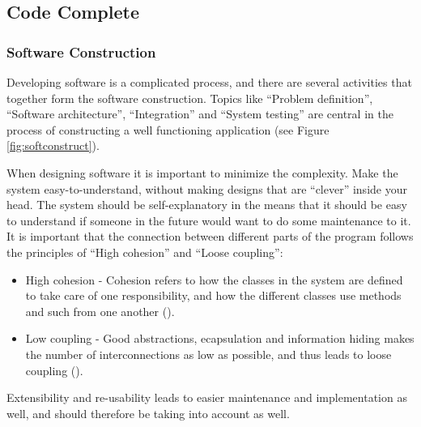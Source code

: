 \subsection{Code Complete}
\subsubsection{Software Construction}
\label{sec:softconstruct}
Developing software is a complicated process, and there are several activities that together form the software construction. Topics like ``Problem definition'', ``Software architecture'', ``Integration'' and ``System testing'' are central in the process of constructing a well functioning application (see Figure \ref{fig:softconstruct}).


When designing software it is important to minimize the complexity. Make the system easy-to-understand, without making designs that are ``clever'' inside your head. The system should be self-explanatory in the means that it should be easy to understand if someone in the future would want to do some maintenance to it. It is important that the connection between different parts of the program follows the principles of ``High cohesion'' and ``Loose coupling'':
\begin{itemize}
	\item High cohesion - Cohesion refers to how the classes in the system are defined to take care of one responsibility, and how the different classes use methods and such from one another (\cite{adamcarlson}).
	\item Low coupling - Good abstractions, ecapsulation and information hiding makes the number of interconnections as low as possible, and thus leads to loose coupling (\cite{adamcarlson}).
\end{itemize}
Extensibility and re-usability leads to easier maintenance and implementation as well, and should therefore be taking into account as well. 

